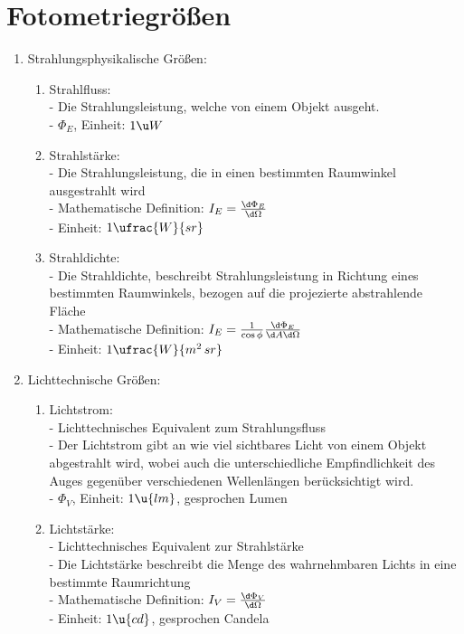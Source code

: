\documentclass[ex]{exercise}
\begin{document}
\section{Fotometriegrö\ss en}

\begin{enumerate}
    \item Strahlungsphysikalische Grö\ss en:
    \begin{enumerate}
        \item Strahlfluss:\\
        - Die Strahlungsleistung, welche von einem Objekt ausgeht.\\
        - $\Phi_E$, Einheit: \(1\u W\)
        
        \item Strahlstärke:\\
        - Die Strahlungsleistung, die in einen bestimmten Raumwinkel ausgestrahlt wird\\
        - Mathematische Definition: \(I_E = \frac{\d \Phi_E}{\d\Omega}\)\\
        - Einheit: \(1 \ufrac{W}{sr}\)
        
        \item Strahldichte:\\
        - Die Strahldichte, beschreibt Strahlungsleistung in Richtung eines bestimmten Raumwinkels, bezogen 
        auf die projezierte abstrahlende Fläche \\
        - Mathematische Definition: \(I_E = \frac{1}{\cos\phi}\frac{\d \Phi_E}{\d A\d\Omega}\)\\
        - Einheit: \(1 \ufrac{W}{m^2\,sr}\)
    \end{enumerate}
    
    \item Lichttechnische Grö\ss en:
    \begin{enumerate}
        \item Lichtstrom:\\
        - Lichttechnisches Equivalent zum Strahlungsfluss\\
        - Der Lichtstrom gibt an
        wie viel sichtbares Licht von einem Objekt abgestrahlt wird, wobei auch die unterschiedliche 
        Empfindlichkeit des Auges gegenüber verschiedenen Wellenlängen berücksichtigt wird.\\
        - \(\Phi_V\), Einheit: \(1\u{lm}\), gesprochen Lumen
    
        \item Lichtstärke:\\
        - Lichttechnisches Equivalent zur Strahlstärke\\
        - Die Lichtstärke beschreibt die Menge des wahrnehmbaren Lichts in eine bestimmte Raumrichtung\\
        - Mathematische Definition: \(I_V = \frac{\d\Phi_V}{\d\Omega}\)\\
        - Einheit: \(1 \u{cd}\), gesprochen Candela


\end{enumerate}
\end{enumerate}
\end{document}
